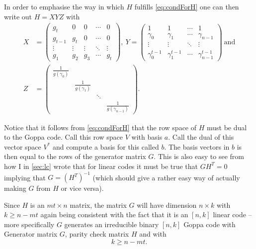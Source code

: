 In order to emphasise the way in which $H$ fulfills \cref{eq:condForH} one can then write out $H = X Y Z$ with
\begin{align*}
X &= \begin{pmatrix}
	g_t & 0 & 0 & \cdots & 0\\
	g_{t-1} & g_t & 0 & \cdots & 0\\
	\vdots & \vdots & \vdots & \ddots & \vdots\\
	g_1 & g_2 & g_3 & \cdots & g_t
\end{pmatrix}, \ Y = \begin{pmatrix}
	1 & 1 & \cdots & 1\\
	\gamma_0 & \gamma_1 & \cdots & \gamma_{n-1}\\
	\vdots & \vdots & \ddots & \vdots\\
	\gamma_0^{t-1} & \gamma_1^{t-1} & \cdots & \gamma_{n-1}^{t-1}
\end{pmatrix} \ \text{and}\\
Z &= \begin{pmatrix}
	\frac{1}{g\left(\gamma_0\right)} & & & \\
	 & \frac{1}{g\left(\gamma_1\right)} & & \\
	 & & \ddots & \\
	 & & & \frac{1}{g\left(\gamma_{n-1}\right)}
\end{pmatrix}.
\end{align*}

Notice that it follows from \ref{eq:condForH} that the row space of $H$ must be dual to the Goppa code. Call this row space $V$ with basis $a$. Call the dual of this vector space $V^{*}$ and compute a basis for this called $b$. The basis vectors in $b$ is then equal to the rows of the generator matrix $G$. This is also easy to see from how I in \cref{sec:lc} wrote that for linear codes it must be true that $GH^T = 0$ implying that $G = \left( H^T \right)^{-1}$ (which should give a rather easy way of actually making $G$ from $H$ or vice versa).

Since $H$ is an $mt \times n$ matrix, the matrix $G$ will have dimension $n \times k$ with $k \geq n - mt$ again being consistent with the fact that it is an $\left[n,k\right]$ linear code -- more specifically $G$ generates an irreducible binary $\left[n,k\right]$ Goppa code with Generator matrix $G$, parity check matrix $H$ and with
\begin{equation}
\label{eq:relForK}
k \geq n - mt.
\end{equation}



